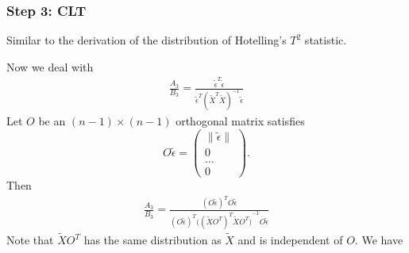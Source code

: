\documentclass[review]{elsarticle}
\theoremstyle{plain}
\theoremstyle{definition}
\theoremstyle{remark}
\begin{document}
\subsubsection{Step 3: CLT}
Similar to the derivation of the distribution of Hotelling's $T^2$ statistic.

Now we deal with 
\begin{equation}
    \begin{aligned}
        \frac{A_3}{B_3}=\frac{\tilde{\epsilon}^T\tilde{\epsilon}
    }{\tilde{\epsilon}^T{(\tilde{X}^T\tilde{X})}^{-1}\tilde{\epsilon}
        }
    \end{aligned}
\end{equation}
Let $O$ be an $(n-1)\times (n-1)$ orthogonal matrix satisfies 
\[
    O\tilde{\epsilon}=
    \begin{pmatrix}
        \|\tilde{\epsilon}\|\\
        0\\
        \ldots\\
        0
    \end{pmatrix}.
    \]
Then
\begin{equation}
    \begin{aligned}
        \frac{A_3}{B_3}=\frac{{(O\tilde{\epsilon})}^T O\tilde{\epsilon}
        }{{(O\tilde{\epsilon})}^T{\big({(\tilde{X}O^T)}^T\tilde{X}O^T\big)}^{-1} O\tilde{\epsilon}
        }
    \end{aligned}
\end{equation}
Note that $\tilde{X}O^T$ has the same distribution as $\tilde{X}$ and is independent of $O$. We have
\end{document}
